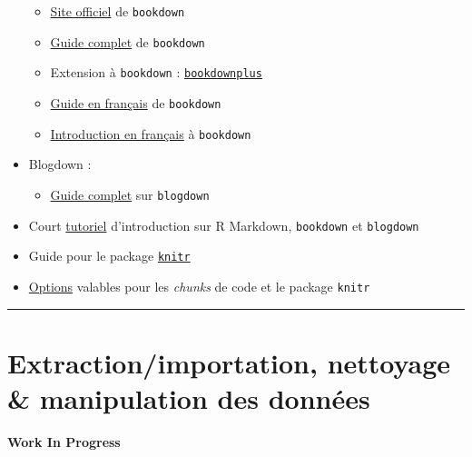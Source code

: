 \documentclass[
  french,
]{book}
\providecommand{\tightlist}{%
  \setlength{\itemsep}{0pt}\setlength{\parskip}{0pt}}
\newenvironment{infobox}[1]
  {
  \begin{itemize}
  \renewcommand{\labelitemi}{
    \raisebox{-.7\height}[0pt][0pt]{
      {\setkeys{Gin}{width=3em,keepaspectratio}
        \texttt{[image: images/\#1]}}
    }
  }
  \setlength{\fboxsep}{1em}
  \begin{blackbox}
  \item
  }
  {
  \end{blackbox}
  \end{itemize}
  }
\begin{document}
\begin{itemize}
  \begin{itemize}
  \tightlist
  \item
    \href{https://bookdown.org/home/about/}{Site officiel} de \texttt{bookdown}
  \item
    \href{https://bookdown.org/yihui/bookdown/}{Guide complet} de \texttt{bookdown}
  \item
    Extension à \texttt{bookdown} : \href{https://bookdown.org/baydap/bookdownplus/}{\texttt{bookdownplus}}
  \item
    \href{https://statistique-et-logiciel-r.com/creer-un-livre-document-avec-bookdown/}{Guide en français}
    de \texttt{bookdown}
  \item
    \href{https://thinkr.fr/rediger-avec-bookdown-pourquoi-comment/}{Introduction en français}
    à \texttt{bookdown}
  \end{itemize}
\item
  Blogdown :

  \begin{itemize}
  \tightlist
  \item
    \href{https://bookdown.org/yihui/blogdown/}{Guide complet} sur \texttt{blogdown}
  \end{itemize}
\item
  Court \href{https://slides.yihui.org/2017-rmarkdown-UNL-Yihui-Xie.html\#1}{tutoriel}
  d'introduction sur R Markdown, \texttt{bookdown} et \texttt{blogdown}
\item
  Guide pour le package \href{https://yihui.org/knitr/}{\texttt{knitr}}
\item
  \href{https://yihui.org/knitr/options/}{Options} valables pour les \emph{chunks} de code
  et le package \texttt{knitr}
\end{itemize}

\begin{center}\rule{0.5\linewidth}{0.5pt}\end{center}

\hypertarget{data-analysis}{%
\chapter{Extraction/importation, nettoyage \& manipulation des données}\label{data-analysis}}

\begin{infobox}{caution}

\textbf{Work In Progress}

\end{infobox}
\end{document}

